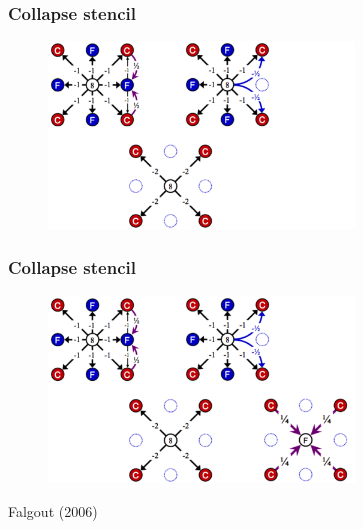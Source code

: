 \documentclass{beamer}
\begin{document}
\begin{frame}

\frametitle{Collapse stencil}


\begin{figure}[h!]
\includegraphics[width=3.2in]{../figures/step3.png}
\end{figure}

\end{frame}


\begin{frame}

\frametitle{Collapse stencil}


\begin{figure}[h!]
\includegraphics[width=3.2in]{../figures/step4.png}
\end{figure}

\tiny{Falgout (2006)}
\end{frame}
\end{document}
